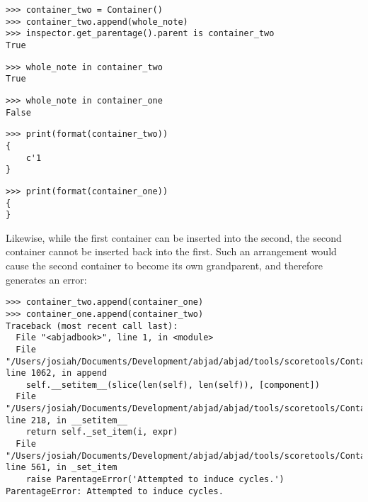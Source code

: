 \begin{comment}
<abjad>
container_two = Container()
container_two.append(whole_note)
inspector.get_parentage().parent is container_two
whole_note in container_two
whole_note in container_one
print(format(container_two))
print(format(container_one))
</abjad>
\end{comment}

\begin{abjadbookoutput}
\begin{singlespacing}
\vspace{-0.5\baselineskip}
\begin{lstlisting}
>>> container_two = Container()
>>> container_two.append(whole_note)
>>> inspector.get_parentage().parent is container_two
True
\end{lstlisting}
\begin{lstlisting}
>>> whole_note in container_two
True
\end{lstlisting}
\begin{lstlisting}
>>> whole_note in container_one
False
\end{lstlisting}
\begin{lstlisting}
>>> print(format(container_two))
{
    c'1
}
\end{lstlisting}
\begin{lstlisting}
>>> print(format(container_one))
{
}
\end{lstlisting}
\end{singlespacing}
\end{abjadbookoutput}

\noindent Likewise, while the first container can be inserted into the second,
the second container cannot be inserted back into the first. Such an
arrangement would cause the second container to become its own grandparent, and
therefore generates an error:

\begin{comment}
<abjad>[allow_exceptions]
container_two.append(container_one)
container_one.append(container_two)
</abjad>
\end{comment}

\begin{abjadbookoutput}
\begin{singlespacing}
\vspace{-0.5\baselineskip}
\begin{lstlisting}
>>> container_two.append(container_one)
>>> container_one.append(container_two)
Traceback (most recent call last):
  File "<abjadbook>", line 1, in <module>
  File "/Users/josiah/Documents/Development/abjad/abjad/tools/scoretools/Container.py", line 1062, in append
    self.__setitem__(slice(len(self), len(self)), [component])
  File "/Users/josiah/Documents/Development/abjad/abjad/tools/scoretools/Container.py", line 218, in __setitem__
    return self._set_item(i, expr)
  File "/Users/josiah/Documents/Development/abjad/abjad/tools/scoretools/Container.py", line 561, in _set_item
    raise ParentageError('Attempted to induce cycles.')
ParentageError: Attempted to induce cycles.
\end{lstlisting}
\end{singlespacing}
\end{abjadbookoutput}

